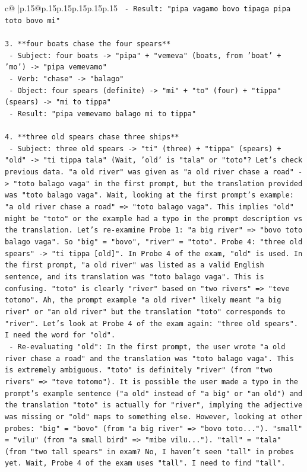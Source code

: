 \documentclass{article}
\begin{document}
{\begin{supertabular}{c@{$\;$}|p{.15\linewidth}@{}p{.15\linewidth}p{.15\linewidth}p{.15\linewidth}p{.15\linewidth}p{.15\linewidth}}
{{{\texttt{   {-} Result: "pipa vagamo bovo tipaga pipa toto bovo mi"} \\
\\ 
\texttt{3. **four boats chase the four spears**} \\
\texttt{   {-} Subject: four boats {-}> "pipa" + "vemeva" (boats, from 'boat' + 'mo') {-}> "pipa vemevamo"} \\
\texttt{   {-} Verb: "chase" {-}> "balago"} \\
\texttt{   {-} Object: four spears (definite) {-}> "mi" + "to" (four) + "tippa" (spears) {-}> "mi to tippa"} \\
\texttt{   {-} Result: "pipa vemevamo balago mi to tippa"} \\
\\ 
\texttt{4. **three old spears chase three ships**} \\
\texttt{   {-} Subject: three old spears {-}> "ti" (three) + "tippa" (spears) + "old" {-}> "ti tippa tala" (Wait, 'old' is "tala" or "toto"? Let's check previous data. "a old river" was given as "a old river chase a road" {-}> "toto balago vaga" in the first prompt, but the translation provided was "toto balago vaga". Wait, looking at the first prompt's example: "a old river chase a road" => "toto balago vaga". This implies "old" might be "toto" or the example had a typo in the prompt description vs the translation. Let's re{-}examine Probe 1: "a big river" => "bovo toto balago vaga". So "big" = "bovo", "river" = "toto". Probe 4: "three old spears" {-}> "ti tippa {[}old{]}". In Probe 4 of the exam, "old" is used. In the first prompt, "a old river" was listed as a valid English sentence, and its translation was "toto balago vaga". This is confusing. "toto" is clearly "river" based on "two rivers" => "teve totomo". Ah, the prompt example "a old river" likely meant "a big river" or "an old river" but the translation "toto" corresponds to "river". Let's look at Probe 4 of the exam again: "three old spears". I need the word for "old".} \\
\texttt{   {-} Re{-}evaluating "old": In the first prompt, the user wrote "a old river chase a road" and the translation was "toto balago vaga". This is extremely ambiguous. "toto" is definitely "river" (from "two rivers" => "teve totomo"). It is possible the user made a typo in the prompt's example sentence ("a old" instead of "a big" or "an old") and the translation "toto" is actually for "river", implying the adjective was missing or "old" maps to something else. However, looking at other probes: "big" = "bovo" (from "a big river" => "bovo toto..."). "small" = "vilu" (from "a small bird" => "mibe vilu..."). "tall" = "tala" (from "two tall spears" in exam? No, I haven't seen "tall" in probes yet. Wait, Probe 4 of the exam uses "tall". I need to find "tall".} \\
}}}
\end{supertabular}}
\end{document}
